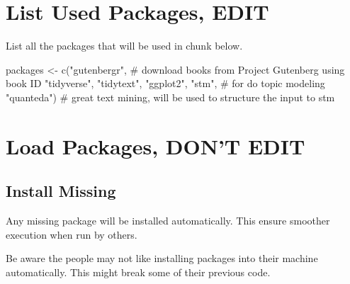 \documentclass[
  letterpaper,
  DIV=11,
  numbers=noendperiod]{scrreprt}
\newenvironment{Shaded}{\begin{snugshade}}{\end{snugshade}}
\newcommand{\CommentTok}[1]{\textcolor[rgb]{0.37,0.37,0.37}{#1}}
\newcommand{\FunctionTok}[1]{\textcolor[rgb]{0.28,0.35,0.67}{#1}}
\newcommand{\NormalTok}[1]{\textcolor[rgb]{0.00,0.23,0.31}{#1}}
\newcommand{\OtherTok}[1]{\textcolor[rgb]{0.00,0.23,0.31}{#1}}
\newcommand{\StringTok}[1]{\textcolor[rgb]{0.13,0.47,0.30}{#1}}
\begin{document}
\section*{List Used Packages, EDIT}\label{list-used-packages-edit-9}


List all the packages that will be used in chunk below.

\begin{Shaded}
\begin{Highlighting}[]
\NormalTok{packages }\OtherTok{\textless{}{-}} \FunctionTok{c}\NormalTok{(}\StringTok{"gutenbergr"}\NormalTok{, }\CommentTok{\# download books from Project Gutenberg using book ID}
              \StringTok{"tidyverse"}\NormalTok{,}
              \StringTok{"tidytext"}\NormalTok{,}
              \StringTok{"ggplot2"}\NormalTok{,}
              \StringTok{"stm"}\NormalTok{, }\CommentTok{\# for do topic modeling}
              \StringTok{"quanteda"}\NormalTok{) }\CommentTok{\# great text mining, will be used to structure the input to stm}
\end{Highlighting}
\end{Shaded}

\section*{Load Packages, DON'T EDIT}\label{sec-packages}


\subsection*{Install Missing}\label{install-missing-9}

Any missing package will be installed automatically. This ensure
smoother execution when run by others.

\begin{tcolorbox}[enhanced jigsaw, arc=.35mm, bottomrule=.15mm, titlerule=0mm, colbacktitle=quarto-callout-important-color!10!white, toptitle=1mm, left=2mm, opacityback=0, coltitle=black, colback=white, opacitybacktitle=0.6, rightrule=.15mm, leftrule=.75mm, breakable, colframe=quarto-callout-important-color-frame, title=\textcolor{quarto-callout-important-color}{\faExclamation}\hspace{0.5em}{Installing Packages on Other People Machine}, bottomtitle=1mm, toprule=.15mm]

Be aware the people may not like installing packages into their machine
automatically. This might break some of their previous code.

\end{tcolorbox}
\end{document}
